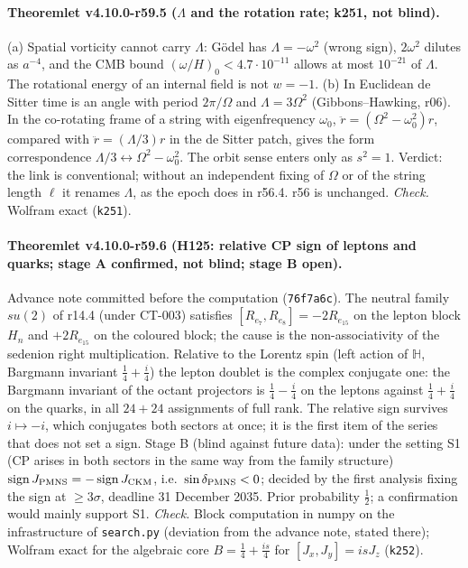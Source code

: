 \paragraph{Theoremlet v4.10.0-r59.5 (\(\Lambda\) and the rotation rate; k251, not blind).}
(a) Spatial vorticity cannot carry \(\Lambda\): Gödel has \(\Lambda=-\omega^2\) (wrong sign), \(2\omega^2\) dilutes as \(a^{-4}\), and the CMB bound
\((\omega/H)_0<4.7\cdot10^{-11}\) allows at most \(10^{-21}\) of \(\Lambda\).  The rotational energy of an internal field is not \(w=-1\).
(b) In Euclidean de Sitter time is an angle with period \(2\pi/\Omega\) and \(\Lambda=3\Omega^2\) (Gibbons--Hawking, r06).  In the co-rotating frame of a
string with eigenfrequency \(\omega_0\), \(\ddot r=(\Omega^2-\omega_0^2)r\), compared with \(\ddot r=(\Lambda/3)r\) in the de Sitter patch, gives the form
correspondence \(\Lambda/3\leftrightarrow\Omega^2-\omega_0^2\).  The orbit sense enters only as \(s^2=1\).
Verdict: the link is conventional; without an independent fixing of \(\Omega\) or of the string length \(\ell\) it renames \(\Lambda\), as the epoch does
in r56.4.  r56 is unchanged.  \emph{Check.} Wolfram exact (\texttt{k251}).

\paragraph{Theoremlet v4.10.0-r59.6 (H125: relative CP sign of leptons and quarks; stage A confirmed, not blind; stage B open).}
Advance note committed before the computation (\texttt{76f7a6c}).  The neutral family \(su(2)\) of r14.4 (under CT-003) satisfies
\([R_{e_7},R_{e_8}]=-2R_{e_{15}}\) on the lepton block \(H_n\) and \(+2R_{e_{15}}\) on the coloured block; the cause is the non-associativity of the sedenion
right multiplication.  Relative to the Lorentz spin (left action of \(\mathbb H\), Bargmann invariant \(\tfrac14+\tfrac i4\)) the lepton doublet is the
complex conjugate one: the Bargmann invariant of the octant projectors is \(\tfrac14-\tfrac i4\) on the leptons against \(\tfrac14+\tfrac i4\) on the quarks, in
all \(24+24\) assignments of full rank.  The relative sign survives \(i\mapsto-i\), which conjugates both sectors at once; it is the first item of
the series that does not set a sign.  Stage B (blind against future data): under the setting S1 (CP arises in both sectors in the same way from
the family structure) \(\operatorname{sign}J_{\rm PMNS}=-\operatorname{sign}J_{\rm CKM}\), i.e.\ \(\sin\delta_{\rm PMNS}<0\); decided by the first analysis
fixing the sign at \(\ge3\sigma\), deadline 31 December 2035.  Prior probability \(\tfrac12\); a confirmation would mainly support S1.
\emph{Check.} Block computation in numpy on the infrastructure of \texttt{search.py} (deviation from the advance note, stated there); Wolfram exact
for the algebraic core \(B=\tfrac14+\tfrac{is}4\) for \([J_x,J_y]=isJ_z\) (\texttt{k252}).

